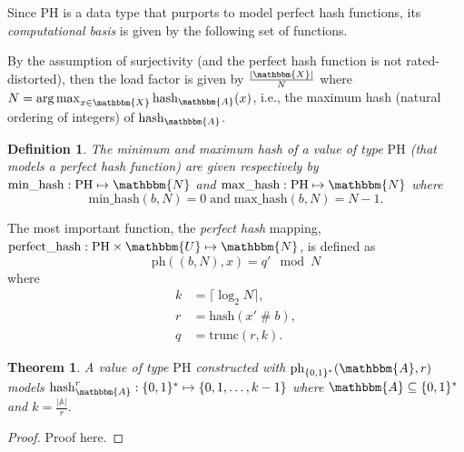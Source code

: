 \documentclass[hidelinks,11pt,final]{article}
\newcommand{\envnumstyle}{section}
\theoremstyle{plain}
\newtheorem{theorem}{Theorem}[\envnumstyle]
\newtheorem{definition}{Definition}[\envnumstyle]
\newcommand{\cat}{\mathbin{\#}}
\newcommand{\Fun}[2][]{\mathrm{#2}_{#1}}
\newcommand{\PH}{\mathrm{PH}}
\DeclareMathOperator*{\argmax}{arg\,max}
\newcommand{\MinHash}{\mathrm{min\_hash}}
\newcommand{\MaxHash}{\mathrm{max\_hash}}
\begin{document}


Since $\PH$ is a data type that purports to model perfect hash functions, its \emph{computational basis} is given by the following set of functions.

By the assumption of surjectivity (and the perfect hash function is not rated-distorted), then the load factor is given by $\frac{|\mathbbm{X}|}{N}$ where $N = \argmax_{x \in \mathbbm{X}} \mathrm{hash}_{\mathbbm{A}}(x)$, i.e., the maximum hash (natural ordering of integers) of $\mathrm{hash}_{\mathbbm{A}}$.
\begin{definition}
The \emph{minimum} and \emph{maximum} hash of a value of type $\PH$ (that models a perfect hash function) are given respectively by $\MinHash : \PH \mapsto \mathbbm{N}$ and $\MaxHash : \PH \mapsto \mathbbm{N}$ where
\begin{equation}
	\mathrm{min\_hash}(b,N) = 0\;\text{and}\;\mathrm{max\_hash}(b,N) = N-1.
\end{equation}
\end{definition}



The most important function, the \emph{perfect hash} mapping, $\mathrm{perfect\_hash} : \mathrm{PH} \times \mathbbm{U} \mapsto \mathbbm{N}$, is defined as
\begin{equation}
	\mathrm{ph}((b,N),x) = q' \mod N
\end{equation}
where
\begin{equation}
\begin{split}
	k &= \lceil \log_2 N \rceil,\\
	r &= \mathrm{hash}(x' \cat b),\\
	q &= \mathrm{trunc}(r,k).
\end{split}
\end{equation}



\begin{theorem}
A value of type $\mathrm{PH}$ constructed with $\mathrm{ph}_{\{0,1\}^*}(\mathbbm{A},r)$ \emph{models} $\mathrm{hash}_{\mathbbm{A}}^{r} : \{0,1\}^* \mapsto \{0,1,\ldots,k-1\}$ where $\mathbbm{A} \subseteq \{0,1\}^*$ and $k = \frac{|\mathbb{A}|}{r}$.
\end{theorem}
\begin{proof}
Proof here.
\end{proof}
\end{document}
